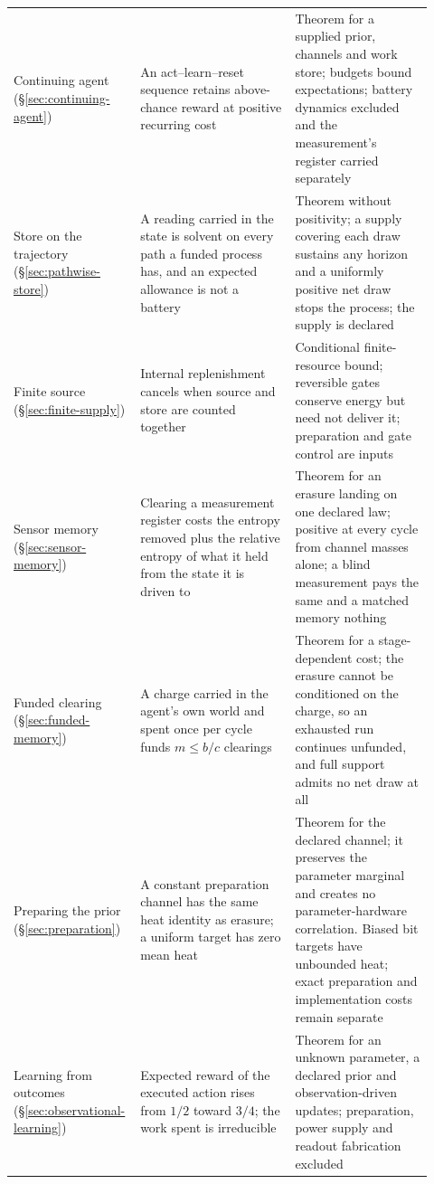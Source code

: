 \documentclass[11pt]{article}
\begin{document}
\begin{longtable}{@{}p{0.24\linewidth}p{0.36\linewidth}p{0.32\linewidth}@{}}
Continuing agent (\S\ref{sec:continuing-agent}) & \raggedright An act--learn--reset sequence retains above-chance reward at positive recurring cost & \raggedright\arraybackslash Theorem for a supplied prior, channels and work store; budgets bound expectations; battery dynamics excluded and the measurement's register carried separately \\
Store on the trajectory (\S\ref{sec:pathwise-store}) & \raggedright A reading carried in the state is solvent on every path a funded process has, and an expected allowance is not a battery & \raggedright\arraybackslash Theorem without positivity; a supply covering each draw sustains any horizon and a uniformly positive net draw stops the process; the supply is declared \\
Finite source (\S\ref{sec:finite-supply}) & \raggedright Internal replenishment cancels when source and store are counted together & \raggedright\arraybackslash Conditional finite-resource bound; reversible gates conserve energy but need not deliver it; preparation and gate control are inputs \\
Sensor memory (\S\ref{sec:sensor-memory}) & \raggedright Clearing a measurement register costs the entropy removed plus the relative entropy of what it held from the state it is driven to & \raggedright\arraybackslash Theorem for an erasure landing on one declared law; positive at every cycle from channel masses alone; a blind measurement pays the same and a matched memory nothing \\
Funded clearing (\S\ref{sec:funded-memory}) & \raggedright A charge carried in the agent's own world and spent once per cycle funds $m\leq b/c$ clearings & \raggedright\arraybackslash Theorem for a stage-dependent cost; the erasure cannot be conditioned on the charge, so an exhausted run continues unfunded, and full support admits no net draw at all \\
\raggedright Preparing the prior (\S\ref{sec:preparation}) & \raggedright A constant preparation channel has the same heat identity as erasure; a uniform target has zero mean heat & \raggedright\arraybackslash Theorem for the declared channel; it preserves the parameter marginal and creates no parameter-hardware correlation. Biased bit targets have unbounded heat; exact preparation and implementation costs remain separate \\
Learning from outcomes (\S\ref{sec:observational-learning}) & Expected reward of the executed action rises from $1/2$ toward $3/4$; the work spent is irreducible & Theorem for an unknown parameter, a declared prior and observation-driven updates; preparation, power supply and readout fabrication excluded \\

\end{longtable}
\end{document}
